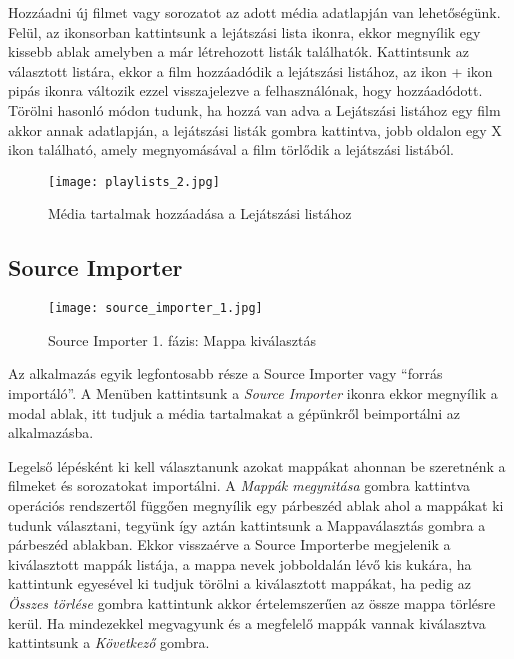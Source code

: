 Hozzáadni új filmet vagy sorozatot az adott média adatlapján van lehetőségünk. Felül, az ikonsorban kattintsunk a lejátszási lista ikonra, ekkor megnyílik egy kissebb ablak amelyben a már létrehozott listák találhatók. Kattintsunk az választott listára, ekkor a film hozzáadódik a lejátszási listához, az ikon + ikon pipás ikonra változik ezzel visszajelezve a felhasználónak, hogy hozzáadódott. Törölni hasonló módon tudunk, ha hozzá van adva a Lejátszási listához egy film akkor annak adatlapján, a lejátszási listák gombra kattintva, jobb oldalon egy X ikon található, amely megnyomásával a film törlődik a lejátszási listából.

\begin{figure}[H]
	\centering
	\texttt{[image: playlists\_2.jpg]}
	\caption{Média tartalmak hozzáadása a Lejátszási listához}
	\label{fig:playlists_2}
\end{figure}

\subsection{Source Importer}
\begin{figure}[H]
	\centering
	\texttt{[image: source\_importer\_1.jpg]}
	\caption{Source Importer 1. fázis: Mappa kiválasztás}
	\label{fig:source_importer_1}
\end{figure}
Az alkalmazás egyik legfontosabb része a Source Importer vagy ``forrás importáló''. A Menüben kattintsunk a {\it Source Importer} ikonra ekkor megnyílik a modal ablak, itt tudjuk a média tartalmakat a gépünkről beimportálni az alkalmazásba.

Legelső lépésként ki kell választanunk azokat mappákat ahonnan be szeretnénk a filmeket és sorozatokat importálni. A {\it Mappák megynitása} gombra kattintva operációs rendszertől függően megnyílik egy párbeszéd ablak ahol a mappákat ki tudunk választani, tegyünk így aztán kattintsunk a Mappaválasztás gombra a párbeszéd ablakban. Ekkor visszaérve a Source Importerbe megjelenik a kiválasztott mappák listája, a mappa nevek jobboldalán lévő kis kukára, ha kattintunk egyesével ki tudjuk törölni a kiválasztott mappákat, ha pedig az {\it Összes törlése} gombra kattintunk akkor értelemszerűen az össze mappa törlésre kerül. Ha mindezekkel megvagyunk és a megfelelő mappák vannak kiválasztva kattintsunk a {\it Következő} gombra.

